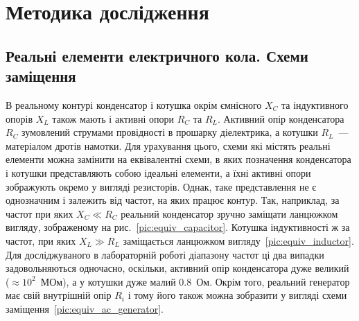 \section{Методика дослідження}

\subsection{Реальні елементи електричного кола. Схеми заміщення}

В реальному контурі конденсатор і котушка окрім ємнісного $X_C$ та індуктивного опорів $X_L$ також мають і активні опори $R_C$ та $R_L$. Активний опір конденсатора $R_C$ зумовлений струмами провідності в прошарку діелектрика, а котушки $R_L$~--- матеріалом дротів намотки. Для урахування цього,  схеми які містять реальні елементи можна замінити на еквівалентні схеми, в яких позначення конденсатора і котушки представляють собою ідеальні елементи, а їхні активні опори зображують окремо у вигляді резисторів. Однак, таке представлення не є однозначним і залежить від частот, на яких працює контур. Так, наприклад, за частот при яких $X_C \ll R_C$ реальний конденсатор зручно заміщати ланцюжком вигляду, зображеному на рис.~\ref{pic:equiv_capacitor}. Котушка індуктивності ж за частот, при яких $X_L \gg R_L$ заміщається ланцюжком вигляду~\ref{pic:equiv_inductor}. Для досліджуваного в лабораторній роботі діапазону частот ці два випадки задовольняються одночасно, оскільки, активний опір конденсатора дуже великий ($\approx 10^2$~МОм), а у котушки дуже малий $0.8$~Ом. Окрім того, реальний генератор має свій внутрішній опір $R_i$ і тому його також можна зобразити у вигляді схеми заміщення~\ref{pic:equiv_ac_generator}.


\begin{figure}[h!]\centering
	
\end{figure}

